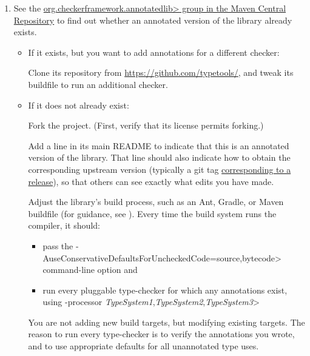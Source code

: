 \begin{enumerate}
\item See the
  \href{https://search.maven.org/search?q=org.checkerframework.annotatedlib}{\<org.checkerframework.annotatedlib>
    group in the Maven Central Repository}
  to find out whether an annotated version of the library already exists.

  \begin{itemize}
  \item
    If it exists, but you want to add annotations for a different checker:

    Clone its repository from \url{https://github.com/typetools/}, and tweak
    its buildfile to run an additional checker.

  \item
    If it does not already exist:

    Fork the project.  (First, verify that its license permits forking.)

    Add a line in its main README to indicate that this is an annotated
    version of the library.  That line should also indicate how to obtain
    the corresponding upstream version (typically a git tag
    \href{https://checkerframework.org/manual/developer-manual.html#annotated-library-version-numbers}{corresponding
      to a release}), so that others can see exactly what edits you have
    made.

  Adjust the library's
  build process, such as an Ant, Gradle, or Maven buildfile (for guidance,
  see ).
    Every time the build system runs the compiler, it should:
    \begin{itemize}
    \item
      pass the \<-AuseConservativeDefaultsForUncheckedCode=source,bytecode>
      command-line option and
    \item
      run every pluggable type-checker for which any
      annotations exist, using \<-processor
      \emph{TypeSystem1},\emph{TypeSystem2},\emph{TypeSystem3}>
    \end{itemize}

  You are not adding new build targets, but modifying existing targets.
  The reason to run every type-checker is to verify
  the annotations you wrote, and to use appropriate defaults for all
  unannotated type uses.
  \end{itemize}


\end{enumerate}
